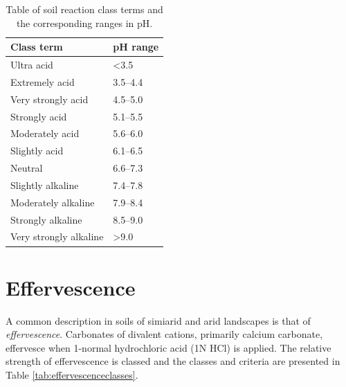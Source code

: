 \documentclass{book}
\begin{document}
\begin{table}[!htbp]
\centering
\caption{Table of soil reaction class terms and the corresponding ranges in pH.}
\label{tab:reactionclass}
\begin{tabular}{ll}
\hline
Class term             & pH range         \\
\hline \hline
Ultra acid             & \textless 3.5    \\
Extremely acid         & 3.5–4.4          \\
Very strongly acid     & 4.5–5.0          \\
Strongly acid          & 5.1–5.5          \\
Moderately acid        & 5.6–6.0          \\
Slightly acid          & 6.1–6.5          \\
Neutral                & 6.6–7.3          \\
Slightly alkaline      & 7.4–7.8          \\
Moderately alkaline    & 7.9–8.4          \\
Strongly alkaline      & 8.5–9.0          \\
Very strongly alkaline & \textgreater 9.0 \\
\hline
\end{tabular}
\end{table}


 
 \section{Effervescence}
 \label{effervescence}
 

A common description in soils of simiarid and arid landscapes is that of \textit{effervescence}. Carbonates of divalent cations, primarily calcium carbonate, effervesce when 1-normal hydrochloric acid (1N HCl) is applied. The relative strength of effervescence is classed and the classes and criteria are presented in Table \ref{tab:effervescenceclasses}.
\end{document}
